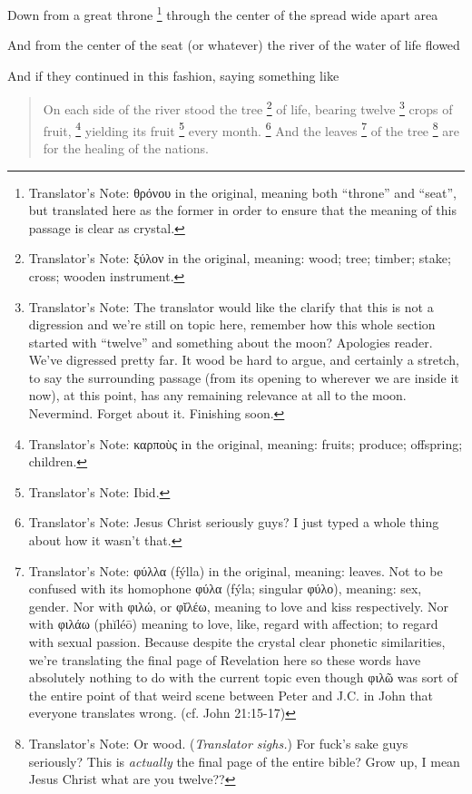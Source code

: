 {{		Down from a great throne%
		\footnote{
			Translator's Note: θρόνου in the original, meaning both ``throne'' and ``seat'',
			but translated here as the former in order to ensure that the meaning of this passage
			is clear as crystal.
		}
		through the center of the spread wide apart area

		And from the center of the seat (or whatever) the river of the water of life flowed

		And if they continued in this fashion, saying something like

		\begin{quote}
		On each side of the river stood the tree%
		\footnote{
			Translator's Note: ξύλον in the original, meaning: wood; tree; timber; stake; cross; wooden instrument.
		}
		of life, bearing twelve%
		\footnote{
			Translator's Note: The translator would like the clarify that this is not a digression
			and we're still on topic here, remember how this whole section started with ``twelve''
			and something about the moon? Apologies reader. We've digressed pretty far.
			It wood be hard to argue, and certainly a stretch, to say the surrounding passage
			(from its opening to wherever we are inside it now), at this point, has any remaining
			relevance at all to the moon. Nevermind. Forget about it. Finishing soon.
		}
		crops of fruit,%
		\footnote{
			Translator's Note: καρποὺς in the original, meaning: fruits; produce; offspring; children.
		}
		yielding its fruit%
		\footnote{
			Translator's Note: Ibid.
		}
		every month.%
		\footnote{
			Translator's Note: Jesus Christ seriously guys? I just typed a whole thing about how it wasn't that.
		}
		And the leaves%
		\footnote{
			Translator's Note: φύλλα (fýlla) in the original, meaning: leaves.
			Not to be confused with its homophone φύλα (fýla; singular φύλο), meaning: sex, gender.
			Nor with φιλώ, or φῐλέω, meaning to love and kiss respectively.
			Nor with φιλάω (phĭléō) meaning to love, like, regard with affection; to regard with sexual passion.
			Because despite the crystal clear phonetic similarities, we're translating the final page of Revelation here
			so these words have absolutely nothing to do with the current topic even though φιλῶ was sort of the entire
			point of that weird scene between Peter and J.C. in John that everyone translates wrong.
			(cf. John 21:15-17)
		}
		of the tree%
		\footnote{
			Translator's Note: Or wood. (\textsl{Translator sighs.}) For fuck's sake guys seriously?
			This is \textit{actually} the final page of the entire bible?
			Grow up, I mean Jesus Christ what are you twelve??
		}
		are for the healing of the nations.
		\end{quote}

}}
